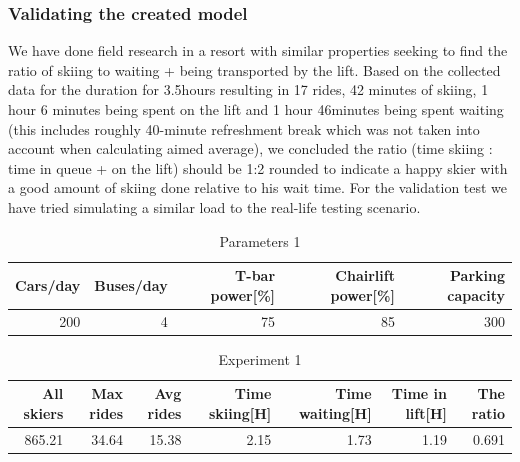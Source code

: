 \documentclass[11pt,a4paper]{article}
\begin{document}
\subsubsection{Validating the created model}
We have done field research in a resort with similar properties seeking to find the ratio of skiing to waiting + being transported by the lift. Based on the collected data for the duration for 3.5hours resulting in 17 rides, 42 minutes of skiing, 1 hour 6 minutes being spent on the lift and 1 hour 46minutes being spent waiting (this includes roughly 40-minute refreshment break which was not taken into account when calculating aimed average), we concluded the ratio (time skiing : time in queue + on the lift) should be 1:2 rounded to indicate a happy skier with a good amount of skiing done relative to his wait time. 
For the validation test we have tried simulating a similar load to the real-life testing scenario.

\begin{table}[H]
		\centering
		\begin{tabular}{|r|r|r|r|r|}
			\hline
			\textbf{Cars/day} &\textbf{Buses/day} & \textbf{T-bar power[\%]} 
				& \textbf{Chairlift power[\%]} & \textbf{Parking capacity} \\ \hline

			 200 & 4 & 75 & 85& 300\\ \hline
		\end{tabular}

		\caption{Parameters 1}
		\label{table:param1}
	\end{table}


\begin{table}[H]
    \centering
    \begin{tabular}{|r|r|r|r|r|r|r|}
        \hline
        \textbf{All skiers} &\textbf{Max rides} & \textbf{Avg rides} 
            & Time skiing[H] & Time waiting[H] & Time in lift[H]
            & \textbf{The ratio} \\ \hline

        865.21 & 34.64 & 15.38 & 2.15 & 1.73 & 1.19 & 0.691  \\ \hline
    \end{tabular}

    \caption{Experiment 1}
    \label{table:experiment1}
\end{table}
\end{document}
